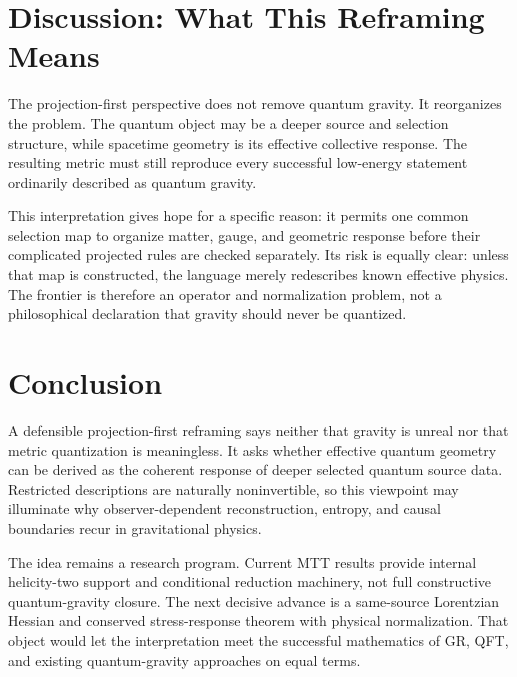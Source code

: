 \documentclass[11pt]{article}
\begin{document}
\section{Discussion: What This Reframing Means}

The projection-first perspective does not remove quantum gravity.  It
reorganizes the problem.  The quantum object may be a deeper source and
selection structure, while spacetime geometry is its effective collective
response.  The resulting metric must still reproduce every successful
low-energy statement ordinarily described as quantum gravity.

This interpretation gives hope for a specific reason: it permits one common
selection map to organize matter, gauge, and geometric response before their
complicated projected rules are checked separately.  Its risk is equally
clear: unless that map is constructed, the language merely redescribes known
effective physics.  The frontier is therefore an operator and normalization
problem, not a philosophical declaration that gravity should never be
quantized.

\section{Conclusion}

A defensible projection-first reframing says neither that gravity is unreal
nor that metric quantization is meaningless.  It asks whether effective
quantum geometry can be derived as the coherent response of deeper selected
quantum source data.  Restricted descriptions are naturally noninvertible,
so this viewpoint may illuminate why observer-dependent reconstruction,
entropy, and causal boundaries recur in gravitational physics.

The idea remains a research program.  Current MTT results provide internal
helicity-two support and conditional reduction machinery, not full
constructive quantum-gravity closure.  The next decisive advance is a
same-source Lorentzian Hessian and conserved stress-response theorem with
physical normalization.  That object would let the interpretation meet the
successful mathematics of GR, QFT, and existing quantum-gravity approaches
on equal terms.
\end{document}

